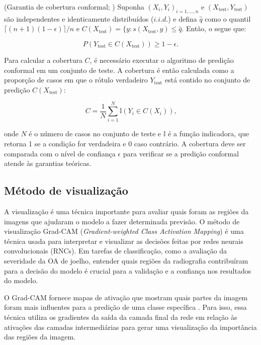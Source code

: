 \begin{theorem}
\label{theorem:conformal-prediction}
    (Garantia de cobertura conformal; \cite{Vovk1999}) Suponha $(X_i,Y_i)_{i=1,...,n}$ e $(X_\text{test},Y_\text{test})$ são independentes e identicamente distribuídos ($i.i.d.$) e defina $\hat{q}$ como o quantil ${\lceil (n+1)(1-\epsilon) \rceil}/n$ e $C(X_\text{test}) = \lbrace y : s(X_\text{test},y) \leq \hat{q}$. Então, o segue que:

    \begin{equation}
        P(Y_\text{test} \in C(X_\text{test})) \geq 1 - \epsilon.
    \end{equation}
\end{theorem}

Para calcular a cobertura $C$, é necessário executar o algoritmo de predição conformal em um conjunto de teste. A cobertura é então calculada como a proporção de casos em que o rótulo verdadeiro $Y_\text{test}$ está contido no conjunto de predição $C(X_\text{test})$:

\begin{equation}
    C = \frac{1}{N} \sum_{i=1}^{N} \mathbb{I}(Y_i \in C(X_i)) \text{,}
\end{equation}

onde $N$ é o número de casos no conjunto de teste e $\mathbb{I}$ é a função indicadora, que retorna 1 se a condição for verdadeira e 0 caso contrário. A cobertura deve ser comparada com o nível de confiança $\epsilon$ para verificar se a predição conformal atende às garantias teóricas.

\subsection{Método de visualização}

A visualização é uma técnica importante para avaliar quais foram as regiões da imagens que ajudaram o modelo a fazer determinada previsão. O método de visualização Grad-CAM (\textit{Gradient-weighted Class Activation Mapping}) é uma técnica usada para interpretar e visualizar as decisões feitas por redes neurais convolucionais (RNCs). Em tarefas de classificação, como a avaliação da severidade da OA de joelho, entender quais regiões da radiografia contribuíram para a decisão do modelo é crucial para a validação e a confiança nos resultados do modelo.

O Grad-CAM fornece mapas de ativação que mostram quais partes da imagem foram mais influentes para a predição de uma classe específica \citep{Selvaraju2016}. Para isso, essa técnica utiliza os gradientes da saída da camada final da rede em relação às ativações das camadas intermediárias para gerar uma visualização da importância das regiões da imagem.

